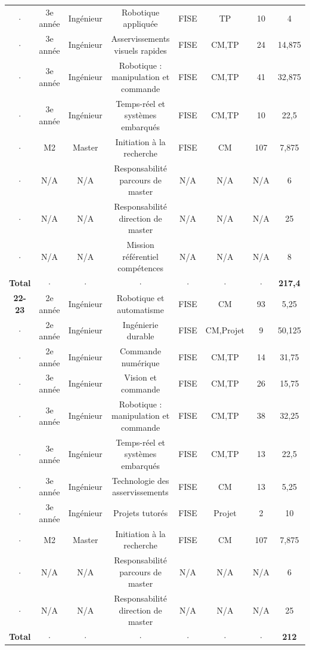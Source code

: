 \documentclass[a4paper,12pt]{article}
\begin{document}
{\begin{tabular}{cccccccc}
  $\cdot$ & 3e année  & Ingénieur & Robotique appliquée  & FISE & TP & 10  & 4  \\
  $\cdot$ & 3e année  & Ingénieur & Asservissements visuels rapides & FISE & CM,TP & 24 & 14,875  \\
  $\cdot$ & 3e année  & Ingénieur & Robotique : manipulation et commande & FISE & CM,TP & 41 & 32,875  \\
  $\cdot$ & 3e année  & Ingénieur & Temps-réel et systèmes embarqués & FISE & CM,TP & 10 & 22,5  \\
  $\cdot$ & M2        & Master    & Initiation à la recherche & FISE & CM & 107 & 7,875  \\
  $\cdot$ & N/A       & N/A       & Responsabilité parcours de master & N/A & N/A & N/A & 6  \\
  $\cdot$ & N/A       & N/A       & Responsabilité direction de master & N/A & N/A & N/A & 25  \\
  $\cdot$ & N/A       & N/A       & Mission référentiel compétences & N/A & N/A & N/A & 8  \\ 
 \bf{Total} & $\cdot$ & $\cdot$ & $\cdot$ & $\cdot$ & $\cdot$ & $\cdot$ &  {\bf 217,4} \\\midrule
\bf{22-23} & 2e année  & Ingénieur & Robotique et automatisme & FISE & CM & 93 & 5,25 \\
 $\cdot$ & 2e année  & Ingénieur & Ingénierie durable  & FISE & CM,Projet & 9  & 50,125  \\
  $\cdot$ & 2e année  & Ingénieur & Commande numérique  & FISE & CM,TP & 14  & 31,75  \\
  $\cdot$ & 3e année  & Ingénieur & Vision et commande & FISE & CM,TP & 26 & 15,75  \\
  $\cdot$ & 3e année  & Ingénieur & Robotique : manipulation et commande & FISE & CM,TP & 38 & 32,25  \\
  $\cdot$ & 3e année  & Ingénieur & Temps-réel et systèmes embarqués & FISE & CM,TP & 13 & 22,5  \\
  $\cdot$ & 3e année  & Ingénieur & Technologie des asservissements & FISE & CM & 13 & 5,25  \\
  $\cdot$ & 3e année  & Ingénieur & Projets tutorés & FISE & Projet & 2 & 10  \\
  $\cdot$ & M2        & Master    & Initiation à la recherche & FISE & CM & 107 & 7,875  \\
  $\cdot$ & N/A       & N/A       & Responsabilité parcours de master & N/A & N/A & N/A & 6  \\
  $\cdot$ & N/A       & N/A       & Responsabilité direction de master & N/A & N/A & N/A & 25  \\
  \bf{Total} & $\cdot$ & $\cdot$ & $\cdot$ & $\cdot$ & $\cdot$ & $\cdot$ &  {\bf 212} \\ \bottomrule
\end{tabular}

}
\end{document}
